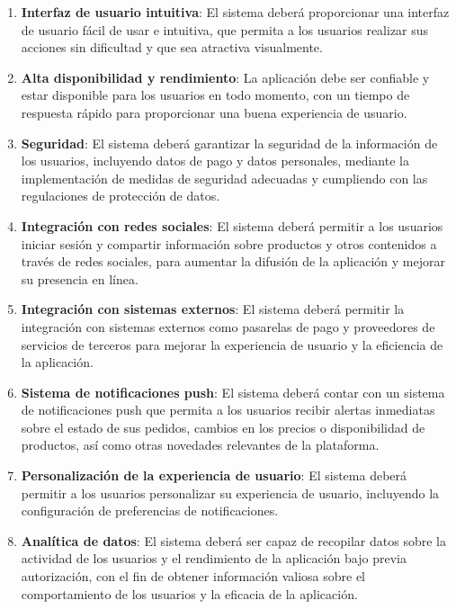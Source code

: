 \begin{enumerate}[label=NFR-\protect\twodigits{\arabic*}:, align=left, leftmargin=*]

\item \textbf{Interfaz de usuario intuitiva}: El sistema deberá proporcionar una interfaz de usuario fácil de usar e intuitiva, que permita a los usuarios realizar sus acciones sin dificultad y que sea atractiva visualmente.

\item \textbf{Alta disponibilidad y rendimiento}: La aplicación debe ser confiable y estar disponible para los usuarios en todo momento, con un tiempo de respuesta rápido para proporcionar una buena experiencia de usuario.

\item \textbf{Seguridad}: El sistema deberá garantizar la seguridad de la información de los usuarios, incluyendo datos de pago y datos personales, mediante la implementación de medidas de seguridad adecuadas y cumpliendo con las regulaciones de protección de datos.

\item \textbf{Integración con redes sociales}: El sistema deberá permitir a los usuarios iniciar sesión y compartir información sobre productos y otros contenidos a través de redes sociales, para aumentar la difusión de la aplicación y mejorar su presencia en línea.

\item \textbf{Integración con sistemas externos}: El sistema deberá permitir la integración con sistemas externos como pasarelas de pago y proveedores de servicios de terceros para mejorar la experiencia de usuario y la eficiencia de la aplicación.

\item \textbf{Sistema de notificaciones push}: El sistema deberá contar con un sistema de notificaciones push que permita a los usuarios recibir alertas inmediatas sobre el estado de sus pedidos, cambios en los precios o disponibilidad de productos, así como otras novedades relevantes de la plataforma.

\item \textbf{Personalización de la experiencia de usuario}: El sistema deberá permitir a los usuarios personalizar su experiencia de usuario, incluyendo la configuración de preferencias de notificaciones.

\item \textbf{Analítica de datos}: El sistema deberá ser capaz de recopilar datos sobre la actividad de los usuarios y el rendimiento de la aplicación bajo previa autorización, con el fin de obtener información valiosa sobre el comportamiento de los usuarios y la eficacia de la aplicación.

\end{enumerate}
